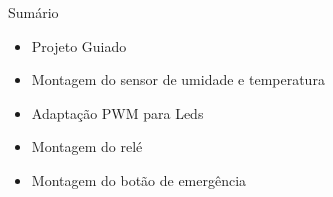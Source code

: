 \begin{frame}{Sumário}
    \begin{itemize}
        \item Projeto Guiado
        \item Montagem do sensor de umidade e temperatura
        \item Adaptação PWM para Leds
        \item Montagem do relé
        \item Montagem do botão de emergência
    \end{itemize}
\end{frame}